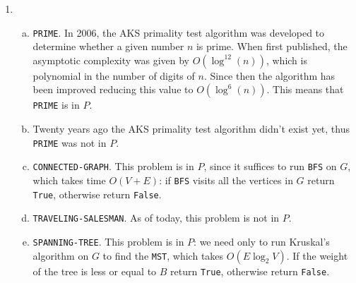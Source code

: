 \documentclass{article}
\begin{document}
\begin{enumerate}[1.]

    \item 
    \begin{enumerate}[(a)]
        \item \texttt{PRIME}. In 2006, the AKS primality test algorithm was developed to determine whether a given number $n$ is prime. When first published, the asymptotic complexity was given by $O(\log^{12}(n))$, which is polynomial in the number of digits of $n$. Since then the algorithm has been improved reducing this value to $O(\log^6(n))$. This means that \texttt{PRIME} is in $P$.
        \item Twenty years ago the AKS primality test algorithm didn't exist yet, thus \texttt{PRIME} was not in $P$.
        \item \texttt{CONNECTED-GRAPH}. This problem is in $P$, since it suffices to run \texttt{BFS} on $G$, which takes time $O(V+E)$: if \texttt{BFS} visits all the vertices in $G$ return \texttt{True}, otherwise return \texttt{False}.
        \item \texttt{TRAVELING-SALESMAN}. As of today, this problem is not in $P$.
        \item \texttt{SPANNING-TREE}. This problem is in $P$: we need only to run Kruskal's algorithm on $G$ to find the \texttt{MST}, which takes $O(E\log_2V)$. If the weight of the tree is less or equal to $B$ return \texttt{True}, otherwise return \texttt{False}.
    \end{enumerate}
    

\end{enumerate}
\end{document}

